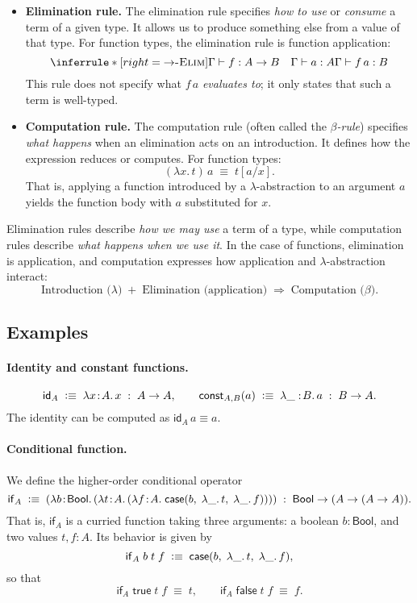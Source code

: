 \documentclass{article}
\newcommand{\defeq}{\vcentcolon\equiv}
\newcommand{\caseof}{\mathsf{case}}
\newcommand{\Bool}{\mathsf{Bool}}
\newcommand{\judg}[3]{#1 \vdash #2 : #3}   %
\newcommand{\jdeq}{\equiv}                 %
\newcommand{\rulename}[1]{\textsc{#1}}
\begin{document}
\begin{itemize}
  \item \textbf{Elimination rule.}  
  The elimination rule specifies \emph{how to use} or \emph{consume} a term of a given type.
  It allows us to produce something else from a value of that type.
  For function types, the elimination rule is function application:
  \[
  \inferrule*[right=\rulename{\(\to\)-Elim}]{
    \judg{\Gamma}{f}{A \to B}
    \quad
    \judg{\Gamma}{a}{A}
  }{
    \judg{\Gamma}{f\,a}{B}
  }
  \]
  This rule does not specify what $f\,a$ \emph{evaluates to}; it only states that
  such a term is well-typed.

  \item \textbf{Computation rule.}  
  The computation rule (often called the \emph{$\beta$-rule}) specifies
  \emph{what happens} when an elimination acts on an introduction.
  It defines how the expression reduces or computes.
  For function types:
  \[
  (\lambda x.\,t)\,a \;\jdeq\; t[a/x].
  \]
  That is, applying a function introduced by a $\lambda$-abstraction
  to an argument $a$ yields the function body with $a$ substituted for $x$.

\end{itemize}

Elimination rules describe \emph{how we may use} a term of a type,
while computation rules describe \emph{what happens when we use it}.
In the case of functions, elimination is application,
and computation expresses how application and $\lambda$-abstraction interact:
\[
\text{Introduction (}\lambda\text{)} \;+\; \text{Elimination (application)} \;\Rightarrow\; \text{Computation (}\beta\text{)}.
\]

\subsection*{Examples}

\paragraph{Identity and constant functions.}
\[
\mathsf{id}_A \;\defeq\; \lambda x\!:\!A.\,x \;:\; A \to A,
\qquad
\mathsf{const}_{A,B}(a) \;\defeq\; \lambda \_:\!B.\,a \;:\; B \to A.
\]
The identity can be computed as \(\mathsf{id}_A\,a \jdeq a\).

\paragraph{Conditional function.}
We define the higher-order conditional operator
\[
\mathsf{if}_A
\;\defeq\;
(\lambda b\!:\!\Bool.\,
  (\lambda t\!:\!A.\,
    (\lambda f\!:\!A.\;
      \caseof(b,\; \lambda\_.\,t,\; \lambda\_.\,f))))
\;:\;
\Bool \to (A \to (A \to A)).
\]
That is, \(\mathsf{if}_A\) is a curried function taking three arguments:
a boolean \(b:\Bool\), and two values \(t,f:A\).
Its behavior is given by
\[
\mathsf{if}_A \; b \; t \; f
\;\defeq\;
\caseof(b,\; \lambda\_.\,t,\; \lambda\_.\,f),
\]
so that
\[
\mathsf{if}_A \; \mathsf{true} \; t \; f \;\jdeq\; t,
\qquad
\mathsf{if}_A \; \mathsf{false} \;t \; f \;\jdeq\; f.
\]
\end{document}
